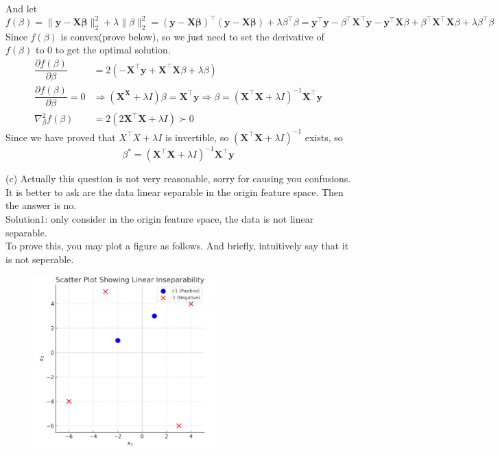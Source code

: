 And let
$$f(\beta)=\|\mathbf{y}-\mathbf{X}\mathbf{\beta}\|_2^2 + \lambda\|\beta\|_2^2=(\mathbf{y}-\mathbf{X}\mathbf{\beta})^{\top}(\mathbf{y}-\mathbf{X}\mathbf{\beta})+\lambda\beta^{\top}\beta=\mathbf{y}^{\top}\mathbf{y}-\beta^{\top}\mathbf{X}^{\top}\mathbf{y}-\mathbf{y}^{\top}\mathbf{X}\beta+\beta^{\top}\mathbf{X}^{\top}\mathbf{X}\beta+\lambda\beta^{\top}\beta$$
Since $f(\beta)$ is convex(prove below), so we just need to set the derivative of $f(\beta)$ to 0 to get the optimal solution.
\begin{align*}
\dfrac{\partial f(\beta)}{\partial \beta} &= 2(-\mathbf{X}^{\top}\mathbf{y}+\mathbf{X}^{\top}\mathbf{X}\beta+\lambda\beta) \\
\dfrac{\partial f(\beta)}{\partial \beta}=0 &\Rightarrow (\mathbf{X}^\mathbf{X}+\lambda I)\beta=\mathbf{X}^{\top}\mathbf{y}\Rightarrow \beta=(\mathbf{X}^{\top}\mathbf{X}+\lambda I)^{-1}\mathbf{X}^{\top}\mathbf{y} \\
\nabla_{\beta}^2 f(\beta) &= 2(2\mathbf{X}^{\top}\mathbf{X}+\lambda I) \succ 0
\end{align*}
Since we have proved that $X^{\top}X+\lambda I$ is invertible, so $(\mathbf{X}^{\top}\mathbf{X}+\lambda I)^{-1}$ exists, so
$$\beta^*=(\mathbf{X}^{\top}\mathbf{X}+\lambda I)^{-1}\mathbf{X}^{\top}\mathbf{y}$$

\newpage
(c) Actually this question is not very reasonable, sorry for causing you confusions. It is better to ask are the data linear separable in the origin feature space. Then the answer is no. \\
Solution1: only consider in the origin feature space, the data is not linear separable. \\
To prove this, you may plot a figure as follows. And briefly, intuitively say that it is not seperable.
\begin{figure}[h]
    \centering
    \includegraphics[width=7cm]{figure/p3.png}
\end{figure}

